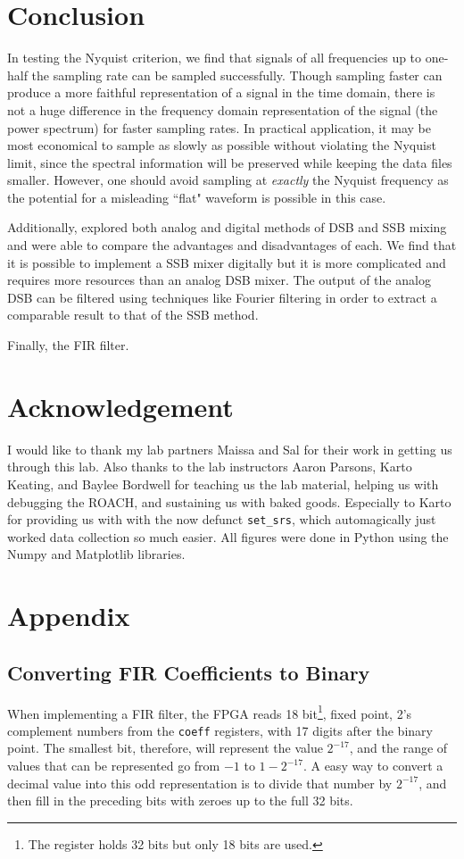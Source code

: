 \documentclass[12pt]{article}
\begin{document}
\section{Conclusion}

In testing the Nyquist criterion, we find that signals of all frequencies up to one-half the sampling rate can be sampled successfully. Though sampling faster can produce a more faithful representation of a signal in the time domain, there is not a huge difference in the frequency domain representation of the signal (the power spectrum) for faster sampling rates. In practical application, it may be most economical to sample as slowly as possible without violating the Nyquist limit, since the spectral information will be preserved while keeping the data files smaller. However, one should avoid sampling at \textit{exactly} the Nyquist frequency as the potential for a misleading ``flat" waveform is possible in this case.

Additionally, explored both analog and digital methods of DSB and SSB mixing and were able to compare the advantages and disadvantages of each. We find that it is possible to implement a SSB mixer digitally but it is more complicated and requires more resources than an analog DSB mixer. The output of the analog DSB can be filtered using techniques like Fourier filtering in order to extract a comparable result to that of the SSB method. 

Finally, the FIR filter.



\section{Acknowledgement}
I would like to thank my lab partners Maissa and Sal for their work in getting us through this lab. Also thanks to the lab instructors Aaron Parsons, Karto Keating, and Baylee Bordwell for teaching us the lab material, helping us with debugging the ROACH, and sustaining us with baked goods. Especially to Karto for providing us with with the now defunct \texttt{set\_srs}, which automagically just worked data collection so much easier.
All figures were done in Python using the Numpy and Matplotlib libraries.

\section{Appendix}
\subsection{Converting FIR Coefficients to Binary}
When implementing a FIR filter, the FPGA reads 18 bit\footnote{The register holds 32 bits but only 18 bits are used.}, fixed point, 2's complement numbers from the \texttt{coeff} registers, with 17 digits after the binary point. The smallest bit, therefore, will represent the value $2^{-17}$, and the range of values that can be represented go from $-1$ to $1-2^{-17}$. A easy way to convert a decimal value into this odd representation is to divide that number by $2^{-17}$, and then fill in the preceding bits with zeroes up to the full 32 bits.
\end{document}

